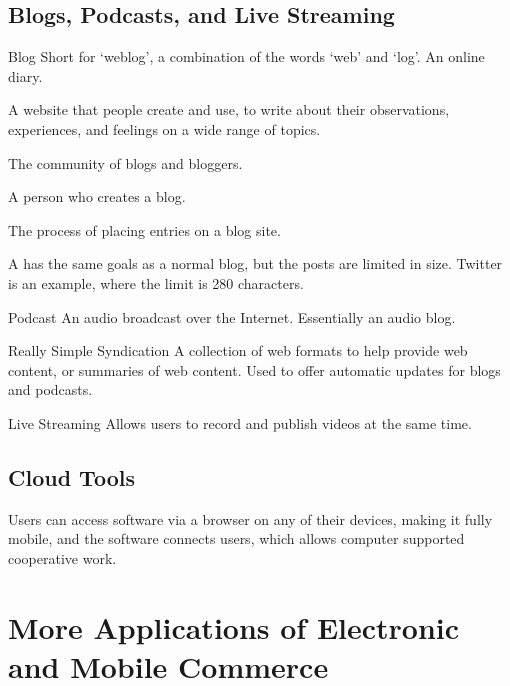 \documentclass[\main/notes.tex]{subfiles}
\begin{document}
			\subsection{Blogs, Podcasts, and Live Streaming}
				\begin{definition}{Blog}
					Short for `weblog', a combination of the words `web' and `log'. An online diary.

					A website that people create and use, to write about their observations, experiences, and feelings on a wide range of topics.
					\begin{description}[nosep]
						\item[Blogosphere] The community of blogs and bloggers.
						\item[Blogger] A person who creates a blog.
						\item[Blogging] The process of placing entries on a blog site.
					\end{description}

					A  has the same goals as a normal blog, but the posts are limited in size. Twitter is an example, where the limit is 280 characters.
				\end{definition}
				\begin{definition}{Podcast}
					An audio broadcast over the Internet. Essentially an audio blog.
				\end{definition}
				\begin{definition}{Really Simple Syndication}
					A collection of web formats to help provide web content, or summaries of web content. Used to offer automatic updates for blogs and podcasts.
				\end{definition}
				\begin{definition}{Live Streaming}
					Allows users to record and publish videos at the same time.
				\end{definition}
			\subsection{Cloud Tools}
				Users can access software via a browser on any of their devices, making it fully mobile, and the software connects users, which allows computer supported cooperative work.

		\section{More Applications of Electronic and Mobile Commerce}
\end{document}
